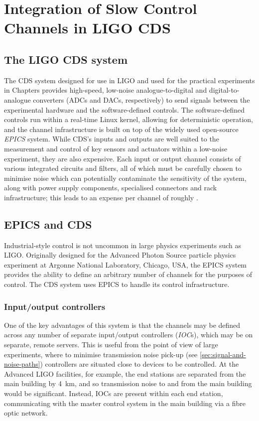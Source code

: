 \chapter{Integration of Slow Control Channels in LIGO CDS}
\label{c:slow-controls-integration}

\section{The LIGO CDS system}
The \gls{CDS} system designed for use in \gls{LIGO} and used for the practical experiments in Chapters  provides high-speed, low-noise analogue-to-digital and digital-to-analogue converters (\gls{ADC}s and \gls{DAC}s, respectively) to send signals between the experimental hardware and the software-defined controls. The software-defined controls run within a real-time Linux kernel, allowing for deterministic operation, and the channel infrastructure is built on top of the widely used open-source \emph{\gls{EPICS}} system. While \gls{CDS}'s inputs and outputs are well suited to the measurement and control of key sensors and actuators within a low-noise experiment, they are also expensive. Each input or output channel consists of various integrated circuits and filters, all of which must be carefully chosen to minimise noise which can potentially contaminate the sensitivity of the system, along with power supply components, specialised connectors and rack infrastructure; this leads to an expense per channel of roughly .

\section{EPICS and CDS}
Industrial-style control is not uncommon in large physics experiments such as \gls{LIGO}. Originally designed for the Advanced Photon Source particle physics experiment at Argonne National Laboratory, Chicago, USA, the \gls{EPICS} system provides the ability to define an arbitrary number of channels for the purposes of control. The \gls{CDS} system uses \gls{EPICS} to handle its control infrastructure.

\subsection{Input/output controllers}
One of the key advantages of this system is that the channels may be defined across any number of separate input/output controllers (\emph{IOC}s), which may be on separate, remote servers. This is useful from the point of view of large experiments, where to minimise transmission noise pick-up (see \ref{sec:signal-and-noise-paths}) controllers are situated close to devices to be controlled. At the Advanced LIGO facilities, for example, the end stations are separated from the main building by \SI{4}{\kilo\meter}, and so transmission noise to and from the main building would be significant. Instead, \gls{IOC}s are present within each end station, communicating with the master control system in the main building via a fibre optic network.

